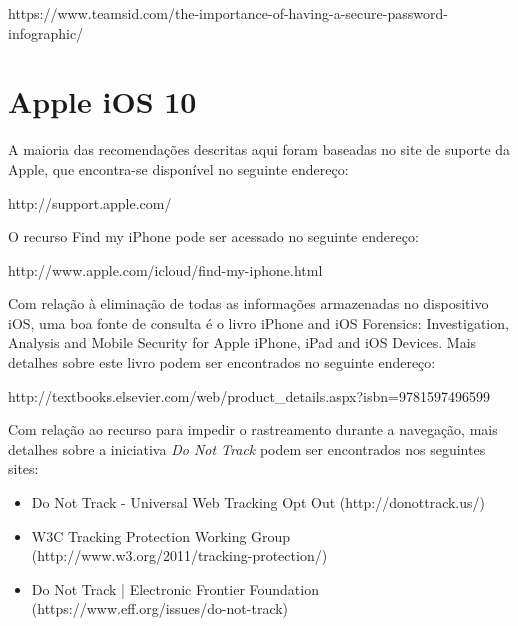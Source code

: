 \vspace{5mm}
https://www.teamsid.com/the-importance-of-having-a-secure-password-infographic/

\section{Apple iOS 10}

A maioria das recomenda\c c\~oes descritas aqui foram baseadas no site de suporte da Apple, que encontra-se dispon\'ivel no seguinte endere\c co:

\vspace{5mm}
http://support.apple.com/
\vspace{5mm}

O recurso Find my iPhone pode ser acessado no seguinte endere\c co:

\vspace{5mm}
http://www.apple.com/icloud/find-my-iphone.html
\vspace{5mm}

Com rela\c c\~ao \`a elimina\c c\~ao de todas as informa\c c\~oes armazenadas no dispositivo iOS, uma boa fonte de consulta \'e o livro iPhone and iOS Forensics: Investigation, Analysis and Mobile Security for Apple iPhone, iPad and iOS Devices. Mais detalhes sobre este livro podem ser encontrados no seguinte endere\c co:

\vspace{5mm}
http://textbooks.elsevier.com/web/product\_details.aspx?isbn=9781597496599
\vspace{5mm}

Com rela\c c\~ao ao recurso para impedir o rastreamento durante a navega\c c\~ao, mais detalhes sobre a iniciativa \textit{Do Not Track} podem ser encontrados nos seguintes sites: 

\begin{itemize}
\item Do Not Track - Universal Web Tracking Opt Out (http://donottrack.us/)
\item W3C Tracking Protection Working Group (http://www.w3.org/2011/tracking-protection/)
\item Do Not Track | Electronic Frontier Foundation (https://www.eff.org/issues/do-not-track)
\end{itemize}
